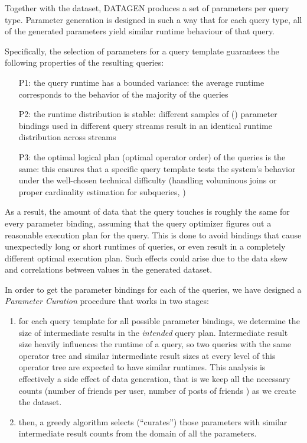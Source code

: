 Together with the dataset, DATAGEN produces a set of parameters per
query type. Parameter generation is designed in such a way that for each query
type, all of the generated parameters yield similar runtime behaviour of that
query.

Specifically, the selection of parameters for a query template guarantees the following properties of the resulting queries:
\begin{enumerate}
\item[P1:] the query runtime has a bounded variance: the average runtime corresponds to the behavior of the majority of the queries
\item[P2:] the runtime distribution is stable: different samples of () parameter bindings used in different query streams result in an identical runtime distribution across streams
\item[P3:] the optimal logical plan (optimal operator order) of the queries is the same: this ensures that a specific query template tests the system's behavior under the well-chosen technical difficulty (\eg handling voluminous joins or proper cardinality estimation for subqueries, \etc)
\end{enumerate}


As a result, the amount of data that the query touches is roughly the
same for every parameter binding, assuming that the query optimizer figures out a
reasonable execution plan for the query. This is done to avoid bindings that
cause unexpectedly long or short runtimes of queries, or even result in a
completely different optimal execution plan. Such effects could arise due to
the data skew and correlations between values in the generated dataset.

In order to get the parameter bindings for each of the queries, we have designed a \textit{Parameter Curation} procedure that works in two stages:

\begin{enumerate}
\item for each query template for all possible parameter bindings, we determine the size of intermediate results in the {\em intended} query plan. Intermediate result size heavily influences the runtime of a query, so two queries with the same operator tree and similar intermediate result sizes at every level of this operator tree are expected to have similar runtimes. This analysis is effectively a side effect of data generation, that is we keep all the necessary counts (number of friends per user, number of posts of friends \etc) as we create the dataset.
\item then, a greedy algorithm selects (``curates'') those parameters with similar intermediate result counts from the domain of all the parameters.
\end{enumerate}

